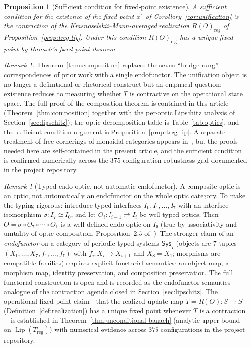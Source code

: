 \documentclass[11pt,a4paper]{article}
\theoremstyle{plain}
\newtheorem{proposition}[theorem]{Proposition}
\theoremstyle{definition}
\theoremstyle{remark}
\newtheorem{remark}[theorem]{Remark}
\DeclareMathOperator{\Lip}{Lip}
\begin{document}
\begin{proposition}[Sufficient condition for fixed-point existence]
\label{prop:sufficient}
A sufficient condition for the existence of the fixed point
$x^{*}$ of Corollary~\ref{cor:unification} is the contraction of the
Krasnoselskii--Mann-averaged realization
$R(O)_{\mathrm{reg}}$ of Proposition~\ref{prop:treg-lip}. Under this
condition $R(O)_{\mathrm{reg}}$ has a unique fixed point by Banach's
fixed-point theorem~\cite{banach1922}.
\end{proposition}

\begin{remark}
Theorem~\ref{thm:composition} replaces the seven ``bridge-rung''
correspondences of prior work with a single endofunctor. The
unification object is no longer a definitional or rhetorical construct
but an empirical question: existence reduces to measuring whether $T$
is contractive on the operational state space. The full proof of the composition theorem is
contained in this article (Theorem~\ref{thm:composition} together
with the per-optic Lipschitz analysis of
Section~\ref{sec:lipschitz}); the optic decomposition table is
Table~\ref{tab:optics}, and the sufficient-condition argument is
Proposition~\ref{prop:treg-lip}. A separate treatment of
free cornerings of monoidal categories appears
in~\cite{riley2023}, but the proofs needed here are self-contained
in the present article, and the sufficient condition is confirmed
numerically across the $375$-configuration robustness grid
documented in the project repository.
\end{remark}

\begin{remark}[Typed endo-optic, not automatic endofunctor]
\label{rem:typed-optic}
A composite optic is an optic, not automatically an endofunctor on the
whole optic category. To make the typing rigorous: introduce typed
interfaces $I_0, I_1, \ldots, I_7$ with an interface isomorphism
$\sigma : I_7 \cong I_0$, and let $O_i : I_{i-1} \rightleftarrows I_i$
be well-typed optics. Then $O = \sigma \circ O_7 \circ \cdots \circ O_1$
is a well-defined endo-optic on $I_0$ (true by associativity and
unitality of optic composition, Proposition~2.3 of~\cite{riley2018optics}).
The stronger claim of an \emph{endofunctor} on a category of periodic
typed systems $\mathsf{Sys}_7$ (objects are 7-tuples
$(X_1, \ldots, X_7, f_1, \ldots, f_7)$ with $f_i : X_i \to X_{i+1}$
and $X_8 = X_1$; morphisms are compatible families) requires explicit
functorial semantics: an object map, a morphism map, identity
preservation, and composition preservation. The full functorial
construction is open and is recorded as
the endofunctor-semantics analogue of the contraction agenda closed
in Section~\ref{sec:lipschitz}. The operational fixed-point claim---that the
realized update map $T = R(O) : S \to S$ (Definition~\ref{def:realization})
has a unique fixed point whenever $T$ is a contraction---is established
in Theorem~\ref{thm:unconditional-banach} (analytic upper bound on
$\Lip(T_{\mathrm{reg}})$) with numerical
evidence across $375$ configurations in the project repository.
\end{remark}
\end{document}
